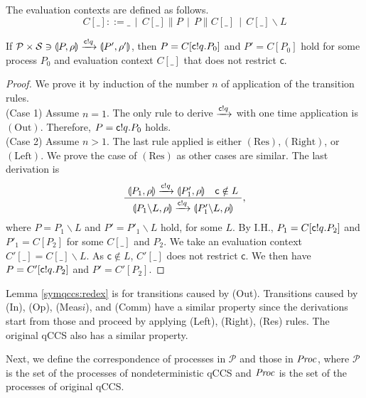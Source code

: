 \begin{defi} The evaluation contexts are defined as follows.
 \[
  C[\_] ::= \_ ~~|~~  C[\_]\lVert P ~~|~~ P\lVert C[\_] ~~|~~ C[\_]
 \backslash L \]
\end{defi}
\begin{lem}
\label{symqccs:redex}
 If $\mathcal{P} \times \mathcal{S}
 \ni \llparenthesis P, \rho \rrparenthesis \xrightarrow{\mathsf{c}! q} \llparenthesis P', \rho' \rrparenthesis$,
 then
 $P = C[\mathsf{c}! q.P_0]$ and $P' = C[P_0]$
 hold for some process $P_0$ and evaluation context $C[\_]$ that does 
 not restrict $\mathsf{c}$.
\end{lem}

\begin{proof}
 We prove it by induction of the number $n$ of application
 of the transition rules. \\
 (Case 1) Assume $n = 1$. The only rule to derive
 $\xrightarrow{\mathsf{c}! q}$ with one time
 application is $\mathrm{(Out)}$. Therefore, $P = \mathsf{c}! q.P_0$
 holds.\\
 (Case 2) Assume $n > 1$. The last rule applied is either 
 $\mathrm{(Res)}, \mathrm{(Right)}$, or $\mathrm{(Left)}$.
 We prove the case of $\mathrm{(Res)}$ as other cases are similar.
 The last derivation is
\[
 \frac{~\llparenthesis P_1, \rho \rrparenthesis \xrightarrow{\mathsf{c}! q} \llparenthesis P'_1, \rho \rrparenthesis~~~
  \mathsf{c} \notin L~} 
 {\llparenthesis P_1 \backslash L, \rho \rrparenthesis \xrightarrow{\mathsf{c}! q}
  \llparenthesis P'_1 \backslash L, \rho \rrparenthesis},
\]
where $P = P_1 \backslash L$ and $P' = P'_1 \backslash L$ 
hold, for some $L$.
By I.H., $P_1 = C[\mathsf{c}! q.P_2]$ and $P'_1 = C[P_2]$ for 
some $C[\_]$ and $P_2$.
We take an evaluation context $C'[\_] = C[\_] \backslash L$.
As $\mathsf{c} \notin L$, $C'[\_]$ does not restrict $\mathsf{c}$.
We then have $P = C'[\mathsf{c}! q.P_2]$ and $P' = C'[P_2]$.
\end{proof}

Lemma \ref{symqccs:redex} is for transitions caused by (Out).
Transitions caused by (In), (Op), (Meas$i$), and (Comm) have
a similar property since the derivations start from those and
proceed by applying (Left), (Right), (Res) rules. The original
qCCS also has a similar property.

Next, we define the correspondence of processes in $\mathcal{P}$ and
those in $\mathit{Proc}$, where $\mathcal{P}$ is the set of 
the processes of nondeterministic qCCS
and $\mathit{Proc}$ is the set of the processes of original qCCS.

